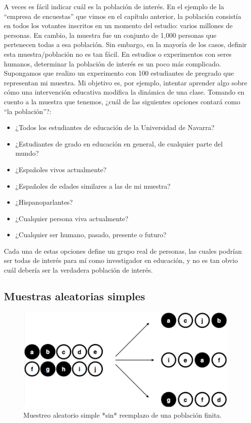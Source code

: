 \documentclass[spanish,]{book}
\providecommand{\tightlist}{%
  \setlength{\itemsep}{0pt}\setlength{\parskip}{0pt}}
\begin{document}
A veces es fácil indicar cuál es la población de interés. En el ejemplo
de la ``empresa de encuestas'' que vimos en el capítulo anterior, la
población consistía en todos los votantes inscritos en un momento del
estudio: varios millones de personas. En cambio, la muestra fue un
conjunto de 1,000 personas que pertenecen todas a esa población. Sin
embargo, en la mayoría de los casos, definir esta muestra/población no
es tan fácil. En estudios o experimentos con seres humanos, determinar
la población de interés es un poco más complicado. Supongamos que
realizo un experimento con 100 estudiantes de pregrado que representan
mi muestra. Mi objetivo es, por ejemplo, intentar aprender algo sobre
cómo una intervención educativa modifica la dinámica de una clase.
Tomando en cuento a la muestra que tenemos, ¿cuál de las siguientes
opciones contará como ``la población''?:

\begin{itemize}
\tightlist
\item
  ¿Todos los estudiantes de educación de la Universidad de Navarra?\\
\item
  ¿Estudiantes de grado en educación en general, de cualquier parte del
  mundo?\\
\item
  ¿Españoles vivos actualmente?\\
\item
  ¿Españoles de edades similares a las de mi muestra?
\item
  ¿Hispanoparlantes?
\item
  ¿Cualquier persona viva actualmente?\\
\item
  ¿Cualquier ser humano, pasado, presente o futuro?
\end{itemize}

Cada una de estas opciones define un grupo real de personas, las cuales
podrían ser todas de interés para mí como investigador en educación, y
no es tan obvio cuál debería ser la verdadera población de interés.

\subsection{Muestras aleatorias
simples}\label{muestras-aleatorias-simples}

\begin{figure}
\includegraphics[width=12.86in]{img/estimation/srs1} \caption{Muestreo aleatorio simple *sin* reemplazo de una población finita.}\label{fig:srs1}
\end{figure}
\end{document}
